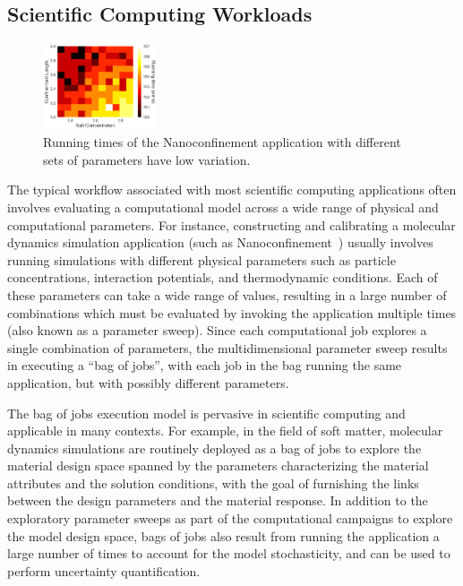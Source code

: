 \vspace*{\subsecspace}
\subsection{Scientific Computing Workloads}


\begin{figure}[t]
  \centering 
  \includegraphics[width=0.3\textwidth]{../graphs/hmap.png}
    \vspace*{\myfigspace}
  \caption{Running times of the Nanoconfinement application with different sets of parameters have low variation.}
  \label{fig:heatmap}
  \vspace*{\myfigspace}
\end{figure}


The typical workflow associated with most scientific computing applications often involves evaluating a computational model across a wide range of physical and computational parameters.
For instance, constructing and calibrating a molecular dynamics simulation application (such as Nanoconfinement~\cite{jing2015ionic,kadupitiya2017,anousheh2020ionic}) usually involves running simulations with different physical parameters such as particle concentrations, interaction potentials, and thermodynamic conditions. 
Each of these parameters can take a wide range of values, resulting in a large number of combinations which must be evaluated by invoking the application multiple times (also known as a parameter sweep). 
Since each computational job explores a single combination of parameters, the multidimensional parameter sweep results in executing a ``bag of jobs'', with each job in the bag running the same application, but with possibly different parameters. 


The bag of jobs execution model is pervasive in scientific computing and applicable in many contexts. For example, in the field of soft matter, molecular dynamics simulations are routinely deployed as a bag of jobs to explore the material design space spanned by the parameters characterizing the material attributes and the solution conditions, with the goal of furnishing the links between the design parameters and the material response.
In addition to the exploratory parameter sweeps as part of the computational campaigns to explore the model design space, bags of jobs also result from running the application a large number of times to account for the model stochasticity, and can be used to %
perform uncertainty quantification.

